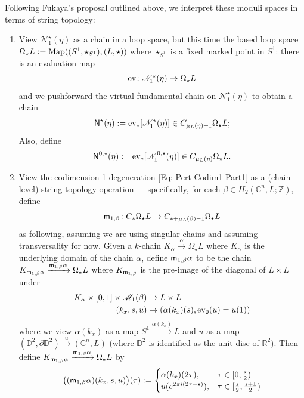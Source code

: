 \documentclass[10pt]{amsart}
\numberwithin{equation}{section}
\theoremstyle{plain}
\theoremstyle{definition}
\theoremstyle{remark}
\numberwithin{equation}{section}
\newcommand{\R}{\mathbb{R}}
\newcommand{\Z}{\mathbb{Z}}
\newcommand{\C}{\mathbb{C}}
\newcommand{\D}{\mathbb{D}}
\newcommand{\Map}{\textup{Map}}
\newcommand{\ev}{\textup{ev}}
\newcommand{\ms}[1]{\mathscr{#1}}
\newcommand{\mm}{\textup{\textsf{m}}}
\newcommand{\NN}{\textup{\textsf{N}}}
\begin{document}
{Following Fukaya's proposal outlined above, we interpret these moduli spaces in terms of string topology:
\begin{enumerate}
	\item View $\ms{N}_1^\star(\eta)$ as a chain in a loop space, but this time the based loop space $\Omega_\star L:= \Map((S^1,\star_{S^1}), (L, \star))$ where $\star_{S^1}$ is a fixed marked point in $S^1$: there is an evaluation map \[ \ev\colon \ms{N}_1^\star(\eta)\to \Omega_\star  L\]and we pushforward the virtual fundamental chain on  $\ms{N}_1^\star(\eta)$ to obtain a chain \[ \NN^\star(\eta):= \ev_*[\ms{N}_1^\star(\eta)] \in C_{\mu_L(\eta)+1} \Omega_\star L; \]
	Also, define \begin{align*}
		\NN^{0,\star}(\eta):= \ev_*[\ms{N}_1^{0,\star}(\eta)]\in C_{\mu_L(\eta)}\Omega_\star L.
	\end{align*}
	\item View the codimension-1 degeneration \eqref{Eq: Pert Codim1 Part1} as a (chain-level) string topology operation --- specifically, for each $\beta\in H_2(\C^n,L;\Z)$, define \begin{align*}
		\mm_{1,\beta}\colon C_*\Omega_\star L\to C_{*+\mu_L(\beta)-1}\Omega_\star L
	\end{align*}as following, assuming we are using singular chains and assuming transversality for now. Given a  $k$-chain $K_\alpha\xrightarrow{\alpha} \Omega_\star L$ where $K_\alpha$ is the underlying domain of the chain $\alpha$, define $\mm_{1,\beta}\alpha$ to be the chain $K_{\mm_{1,\beta}\alpha}\xrightarrow{\mm_{1,\beta}\alpha} \Omega_\star L$ where $K_{\mm_{1,\beta}}$ is the pre-image of the diagonal of $L\times L$ under \begin{align}\label{Eq: BasedLoopDegen1}
		K_\alpha \times [0,1]\times \ms{M}_1(\beta) &\to L\times L\\
		(k_x, s,u) &\mapsto (\alpha(k_x)(s), \ev_0(u)=u(1))\nonumber
	\end{align} 
	where we view $\alpha(k_x)$ as a map $S^1\xrightarrow{\alpha(k_x)} L$ and $u$ as a map $(\D^2,\partial \D^2)\xrightarrow{u} (\C^n,L)$ (where $\D^2$ is identified as the unit disc of $\R^2$). Then define $K_{\mm_{1,\beta}\alpha}\xrightarrow{\mm_{1,\beta}\alpha} \Omega_\star L$ by \begin{align}\label{Eq: BasedLoopDegen2}
		\big((\mm_{1,\beta}\alpha) (k_x,s,u)\big)(\tau):= \begin{cases}
			\alpha(k_x)(2\tau), & \tau \in [0,\frac{s}{2}) \\
			u(e^{2\pi i(2\tau -s)}), & \tau \in [\frac{s}{2}, \frac{s+1}{2})\\

\end{cases}
\end{align}
\end{enumerate}}
\end{document}
